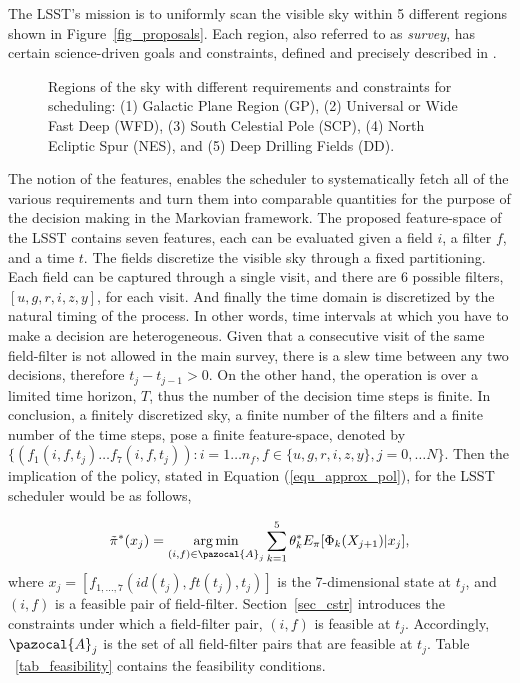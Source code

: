 \documentclass[12pt]{aastex62}
\theoremstyle{definition}
\DeclareMathOperator*{\argmin}{arg\,min}
\begin{document}
The LSST's mission is to uniformly scan the visible sky within 5 different regions shown in Figure~\ref{fig_proposals}. Each region, also referred to as \textit{survey}, has certain science-driven goals and constraints, defined and precisely described in \citep{ivezic2008large}.

\begin{figure}[h!]
\begin{center}
\caption{Regions of the sky with different requirements and constraints for scheduling: (1) Galactic Plane Region (GP), (2) Universal or Wide Fast Deep (WFD), (3) South Celestial Pole (SCP), (4) North Ecliptic Spur (NES), and (5) Deep Drilling Fields (DD).}
\end{center}
\end{figure}\label{fig_proposals}

 The notion of the features, enables the scheduler to systematically fetch all of the various requirements and turn them into comparable quantities for the purpose of the decision making in the Markovian framework. The proposed feature-space of the LSST contains seven features, each can be evaluated given a field $i$, a filter $f$, and a time $t$. The fields discretize the visible sky through a fixed partitioning. Each field can be captured through a single visit, and there are 6 possible filters, $[u,g,r,i,z,y]$, for each visit. And finally the time domain is discretized by the natural timing of the process. In other words, time intervals at which you have to make a decision are heterogeneous. Given that a consecutive visit of the same field-filter is not allowed in the main survey, there is a slew time between any two decisions, therefore $t_{j} - t_{j-1} > 0$. On the other hand, the operation is over a limited time horizon, $T$, thus the number of the decision time steps is finite. In conclusion, a finitely discretized sky, a finite number of the filters and a finite number of the time steps, pose a finite feature-space, denoted by $\{(f_1(i,f,t_j)\dots f_7(i,f,t_j)): i = 1\dots n_f, f\in \{u,g,r,i,z,y\}, j = 0,\dots N\}$. Then the implication of the policy, stated in Equation (\ref{equ_approx_pol}), for the LSST scheduler would be as follows,

\begin{equation}\label{equ_approx_pol_imp}
\tilde{\pi}^*(x_j)= \argmin_{(i,f)\in \pazocal{A}_{j}} \sum_{k=1}^5 \theta^*_k E_{\pi}[\Phi_k(X_{j+1}) | x_j]\\,
\end{equation}
where $x_j = [f_{1, \dots,7}(id(t_j),ft(t_j),t_j)]$ is the 7-dimensional state at $t_j$, and $(i,f)$ is a feasible pair of field-filter. Section~\ref{sec_cstr} introduces the constraints under which a field-filter pair, $(i,f)$ is feasible at $t_{j}$. Accordingly, $\pazocal{A}_j$ is the set of all field-filter pairs that are feasible at $t_j$. Table ~\ref{tab_feasibility} contains the feasibility conditions.
\end{document}
